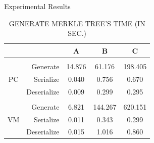 \documentclass{beamer}
\begin{document}
\begin{CJK}{UTF8}{bkai}
\begin{frame}{Experimental Results}
\begin{table}[]
		\caption{GENERATE MERKLE TREE'S TIME (IN SEC.)}
		\begin{tabular}{|c|r|c|c|c|}
			\hline
			   &             & A      & B       & C       \\ \hline
               &             &        &		    &		  \\ \hline
			   & Generate    & 14.876 & 61.176  & 198.405 \\ \cline{2-5} 
			PC & Serialize   & 0.040  & 0.756   & 0.670   \\ \cline{2-5} 
			   & Deserialize & 0.009  & 0.299   & 0.295   \\ \hline
		   	   &             &        &         &         \\ \hline
			   & Generate    & 6.821  & 144.267 & 620.151 \\ \cline{2-5} 
			VM & Serialize   & 0.011  & 0.343   & 0.299   \\ \cline{2-5} 
			   & Deserialize & 0.015  & 1.016   & 0.860   \\
			\hline
		\end{tabular}
	\end{table}
\end{frame}


\end{CJK}
\end{document}
